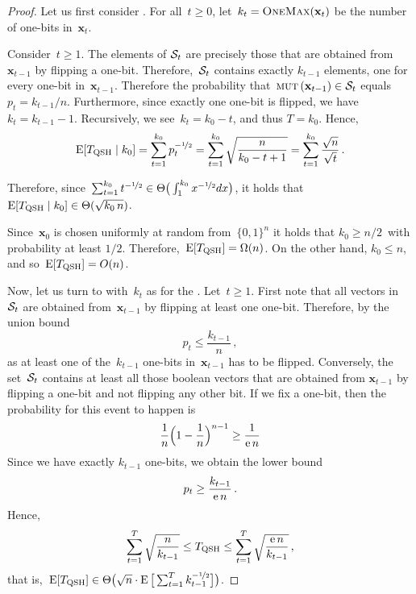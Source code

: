\begin{proof}
Let us first consider \qrls. For all~$t\geq 0$, let~$k_t=\textsc{OneMax}(\mathbf{x}_t)$ be the number of one-bits in~$\mathbf{x}_t$.

Consider~$t\geq 1$. The elements of $\mathcal{S}_t$ are precisely those that are obtained from $\mathbf{x}_{t-1}$ by flipping a one-bit. Therefore,~$\mathcal{S}_t$ contains exactly $k_{t-1}$ elements, one for every one-bit in~$\mathbf{x}_{t-1}$. Therefore the probability that~$\textsc{mut}\left(\mathbf{x}_{t-1}\right)\in\mathcal{S}_t$ equals $p_t = k_{t-1}/n$. Furthermore, since exactly one one-bit is flipped, we have~$k_t=k_{t-1}-1$. Recursively, we see~$k_t =k_0-t$, and thus $T=k_0$. Hence,
\[
\operatorname{E}[T_{\mathrm{QSH}}\mid k_0] = \sum_{t=1}^{k_0}p_t^{-\nicefrac{1}{2}} =  \sum_{t=1}^{k_0}\sqrt{\frac{n}{k_0-t+1}}  = \sum_{t=1}^{k_0}\frac{\sqrt{n}}{\sqrt{t}}\,.
\]

Therefore, since~$\sum_{t=1}^{k_0}t^{-\nicefrac{1}{2}}\in\Theta\big(\int_1^{k_0}x^{-\nicefrac{1}{2}}dx\big)$, it holds that~$\operatorname{E}[T_{\mathrm{QSH}}\mid k_0]\in\Theta(\sqrt{k_0\,n})$.

Since~$\mathbf{x}_0$ is chosen uniformly at random from~$\{0,1\}^n$ it holds that $k_0\geq n/2$~with probability at least $1/2$. Therefore,~$\operatorname{E}[T_{\mathrm{QSH}}] = \Omega(n)$. On the other hand, $k_0 \le n$, and so~$\operatorname{E}[T_{\mathrm{QSH}}] = {O}(n)$.


 
Now, let us turn to \qooea with~$k_t$ as for the \qrls. Let~$t\ge 1$. First note that all vectors in~$\mathcal{S}_t$ are obtained from~$\mathbf{x}_{t-1}$ by flipping at least one one-bit. Therefore, by the union bound
\[
p_t\le\frac{ k_{t-1}}{n}\,,
\]
as at least one of the~$k_{t-1}$ one-bits in~$\mathbf{x}_{t-1}$ has to be flipped. Conversely, the set~$\mathcal{S}_t$ contains at least all those boolean vectors that are obtained from $\mathbf{x}_{t-1}$ by flipping a one-bit and not flipping any other bit. If we fix a one-bit, then the probability for this event to happen is
\[
\frac{1}{n}\Big(1-\frac{1}{n}\Big)^{n-1} \geq \frac{1}{\mathrm{e}\,n}
\]
Since we have exactly $k_{t-1}$ one-bits, we obtain the lower bound
\[
p_t\ge\frac{k_{t-1}}{\mathrm{e}\,n}\,.
\]
Hence,
\[
\sum_{t=1}^{T}\sqrt{\frac{n}{k_{t-1}}}\le T_{\mathrm{QSH}}\le\sum_{t=1}^{T}\sqrt{\frac{\mathrm{e}\,n}{k_{t-1}}}\,,
\]
that is,~$\operatorname{E}[T_{\mathrm{QSH}}]\in\Theta\big(\sqrt{n}\cdot\operatorname{E}\big[\sum_{t=1}^{T}k_{t-1}^{-\nicefrac{1}{2}}\big]\big)$.



\end{proof}
